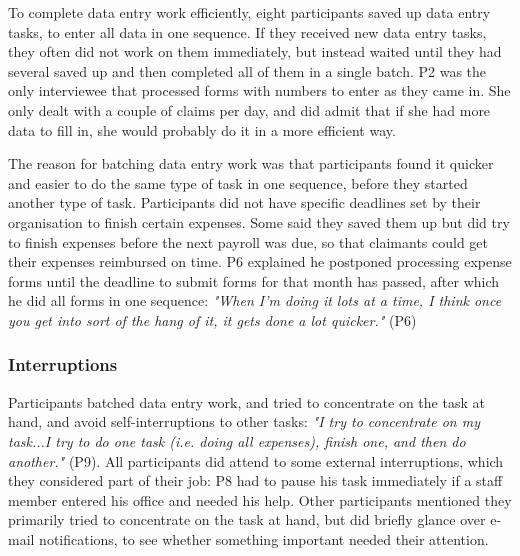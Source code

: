 To complete data entry work efficiently, eight participants saved up data entry tasks, to enter all data in one sequence. If they received new data entry tasks, they often did not work on them immediately, but instead waited until they had several saved up and then completed all of them in a single batch. P2 was the only interviewee that processed forms with numbers to enter as they came in. She only dealt with a couple of claims per day, and did admit that if she had more data to fill in, she would probably do it in a more efficient way.

The reason for batching data entry work was that participants found it quicker and easier to do the same type of task in one sequence, before they started another type of task. Participants did not have specific deadlines set by their organisation to finish certain expenses. Some said they saved them up but did try to finish expenses before the next payroll was due, so that claimants could get their expenses reimbursed on time. P6 explained he postponed processing expense forms until the deadline to submit forms for that month has passed, after which he did all forms in one sequence: \textit{"When I’m doing it lots at a time, I think once you get into sort of the hang of it, it gets done a lot quicker."} (P6)

\subsubsection{Interruptions}
Participants batched data entry work, and tried to concentrate on the task at hand, and avoid self-interruptions to other tasks: \textit{"I try to concentrate on my task...I try to do one task (i.e. doing all expenses), finish one, and then do another."} (P9). All participants did attend to some external interruptions, which they considered part of their job: P8 had to pause his task immediately if a staff member entered his office and needed his help. Other participants mentioned they primarily tried to concentrate on the task at hand, but did briefly glance over e-mail notifications, to see whether something important needed their attention.

